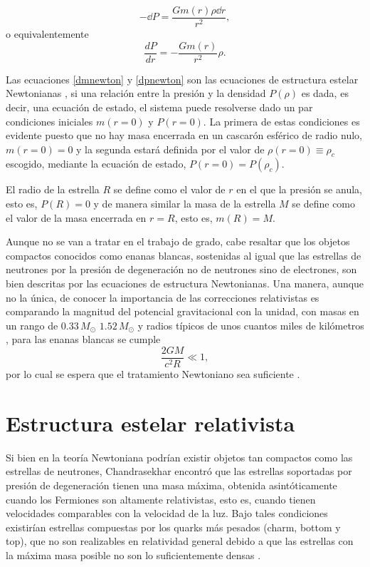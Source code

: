 \begin{equation}
    -\dd P =\frac{Gm(r)\rho\dd r}{r^2},
\end{equation}
o equivalentemente
\begin{equation}
    \frac { d P } { d r } = - \frac { G m ( r ) } { r ^ { 2 } } \rho.
    \label{dpnewton}
\end{equation}

Las ecuaciones \eqref{dmnewton} y \eqref{dpnewton} son las ecuaciones de estructura estelar Newtonianas \cite{Chandrasekhar1958AnStructure}, si una relación entre la presión y la densidad $P(\rho)$ es dada, es decir, una ecuación de estado, el sistema puede resolverse dado un par condiciones iniciales $m(r=0)$ y $P(r=0)$. La primera de estas condiciones es evidente puesto que no hay masa encerrada en un cascarón esférico de radio nulo, $m(r=0)=0$ y la segunda estará definida por el valor de $\rho(r=0)\equiv\rho_c$ escogido, mediante la ecuación de estado, $P(r=0)=P(\rho_c)$.

El radio de la estrella $R$ se define como el valor de $r$ en el que la presión se anula, esto es, $P(R)=0$ y de manera similar la masa de la estrella $M$ se define como el valor de la masa encerrada en $r=R$, esto es, $m(R)=M$.

Aunque no se van a tratar en el trabajo de grado, cabe resaltar que los objetos compactos conocidos como enanas blancas, sostenidas al igual que las estrellas de neutrones por la presión de degeneración no de neutrones sino de electrones, son bien descritas por las ecuaciones de estructura Newtonianas. Una manera, aunque no la única, de conocer la importancia de las correcciones relativistas es comparando la magnitud del potencial gravitacional con la unidad, con masas en un rango de $0.33\,M_{\odot}$ $1.52\,M_{\odot}$ y radios típicos de unos cuantos miles de kilómetros \cite{Glendenning2000CompactStars}, para las enanas blancas se cumple
\begin{equation}
    \frac{2GM}{c^2R}\ll 1,
\end{equation}
por lo cual se espera que el tratamiento Newtoniano sea suficiente \cite{Weinberg1972GravitationCosmology}. 

\section{Estructura estelar relativista}

Si bien en la teoría Newtoniana podrían existir objetos tan compactos como las estrellas de neutrones, Chandrasekhar encontró que las estrellas soportadas por presión de degeneración tienen una masa máxima, obtenida asintóticamente cuando los Fermiones son altamente relativistas, esto es, cuando tienen velocidades comparables con la velocidad de la luz. Bajo tales condiciones existirían estrellas compuestas por los quarks más pesados (charm, bottom y top), que no son realizables en relatividad general debido a que las estrellas con la máxima masa posible no son lo suficientemente densas \cite{Glendenning2000CompactStars}.

